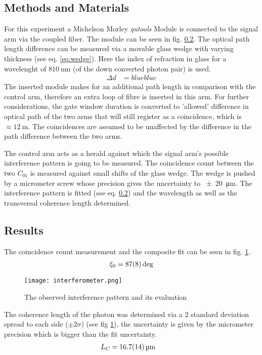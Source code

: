 \documentclass[12pt,a4paper]{article} %
\begin{document}
\subsection{Methods and Materials}
For this experiment a Michelson Morley \textit{qutools} Module is connected to the signal arm via the coupled fiber. The module can be seen in fig. \ref{}. The optical path length difference can be measured via a movable glass wedge with varying thickness (see eq. \ref{eq:wedge}). Here the index of refraction in glass for a wavelenght of $\qty{810}{\nano\meter}$ (of the down converted photon pair) is used.
\begin{align}
    \Delta d &= blueblue
\label{eq:wedge}
\end{align}
The inserted module makes for an additional path length in comparison with the control arm, therefore an extra loop of fibre is inserted in this arm. For further considerations, the gate window duration is converted to 'allowed' difference in optical path of the two arms that will still register as a coincidence, which is $\approx \qty{12}{\meter}$. The coincidences are assumed to be unaffected by the difference in the path difference between the two arms.

The control arm acts as a herald against which the signal arm's possible interference pattern is going to be measured. The coincidence count between the two $C_{01}$ is measured against small shifts of the glass wedge. The wedge is pushed by a micrometer screw whose precision gives the uncertainty to \qty{\pm 20}{\micro\meter}. The interference pattern is fitted (see eq. \ref{}) and the wavelength as well as the transversal coherence length determined.

\subsection{Results}
The coincidence count measurement and the composite fit can be seen in fig. \ref{fig:interferometry fit}. 
\begin{align*}
    \xi_0 = \qty{87 \pm 8}{\deg}
\end{align*}
\begin{figure}[h]
    \centering
    \texttt{[image: interferometer.png]}
    \caption{The observed interference pattern and its evaluation}
    \label{fig:interferometry fit}
\end{figure}
The coherence length of the photon was determined via a 2 standard deviation spread to each side ($\pm 2\sigma$) (see fig \ref{fig:interferometry fit}), the uncertainty is given by the micrometer precision which is bigger than the fit uncertainty.
\begin{align*}
    L_C &= \qty{16.7 \pm 1.4}{\micro\meter} 
\end{align*}
\end{document}
